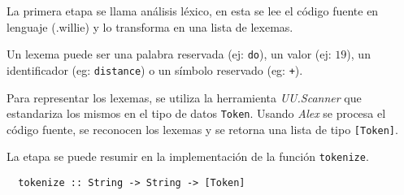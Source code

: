   La primera etapa se llama análisis léxico, en esta se lee el código
  fuente en lenguaje \frob{} (.willie) y lo transforma en una
  lista de lexemas.

  Un lexema puede ser una palabra reservada (ej: \texttt{do}),
  un valor (ej: $19$), un identificador (eg: \texttt{distance}) o un símbolo reservado (eg: \texttt{+}).

  Para representar los lexemas, se utiliza la herramienta \textit{UU.Scanner}
  \cite{uuparser} que estandariza los mismos en el tipo de
  datos \texttt{Token}.
  Usando \textit{Alex} se procesa el código fuente, se reconocen los lexemas y se retorna una lista de tipo \texttt{[Token]}.

  La etapa se puede resumir en la implementación de la función \texttt{tokenize}.

\begin{Verbatim}
  tokenize :: String -> String -> [Token]
\end{Verbatim}


